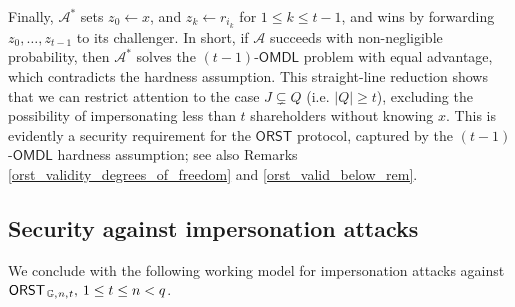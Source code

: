 \documentclass{iacrtrans}
\begin{document}
Finally,
$\mathcal{A}^*$ sets $z_0 \leftarrow x$,
and $z_k \leftarrow r_{i_k}$ for $1 \le k \le t-1$,
and wins by forwarding
$z_0, \dots, z_{t-1}$ to its challenger.
In short, if $\mathcal{A}$ succeeds
with non-negligible probability, then $\mathcal{A}^*$
solves the $(t-1)$-$\mathsf{OMDL}$ problem with equal advantage,
which contradicts the hardness assumption.
This straight-line reduction shows that we can restrict attention
to the case $J \subsetneq Q$ (i.e. $|Q| \ge t$),
excluding the possibility of impersonating less than $t$
shareholders without knowing $x$.
This is evidently a security requirement for the $\mathsf{ORST}$
protocol, captured by the $(t-1)$-$\mathsf{OMDL}$
hardness assumption; see also Remarks
\ref{orst_validity_degrees_of_freedom} and
\ref{orst_valid_below_rem}.

\subsection{Security against impersonation attacks}\label{section_security_imp}

\noindent
We conclude with the following working model
for impersonation attacks against
$
\mathsf{ORST}
	_{\hspace{1pt}\mathbb{G},\hspace{0.5pt} n,\hspace{0.5pt} t},
\hspace{2pt} 1 \le t \le n < q
$.
\end{document}
